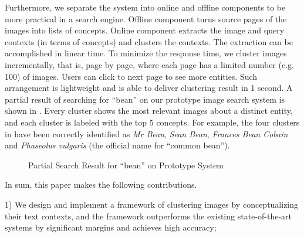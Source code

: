 Furthermore, we separate the system into online and offline
components to be more practical in a search engine.
Offline component turns source pages of the images into lists of
concepts. Online component extracts the image and query contexts (in terms of
concepts) and clusters the contexts.
The extraction can be accomplished in linear time.
To minimize the response time, we cluster images incrementally, that is,
page by page, where each page has a limited number
(e.g. 100) of images. Users can click to next page to see more entities.
Such arrangement is lightweight and is
able to deliver clustering result in 1 second.
A partial result of searching for ``bean'' on our prototype image search system
is shown in .
Every cluster shows the
most relevant images about a distinct entity, and each cluster is labeled with
the top 5 concepts. For example,
the four clusters in  have been correctly identified
as {\em Mr Bean}, {\em Sean Bean}, {\em Frances Bean Cobain} and
{\em Phaseolus vulgaris}
(the official name for ``common bean'').

\begin{figure}[th]
\centerline{}
\caption{Partial Search Result for ``bean'' on Prototype System}
\label{fig:demo-bean}
\end{figure}

In sum, this paper makes the following contributions.

1) We design and implement a framework of clustering images by
conceptualizing their text contexts, and the framework
outperforms the existing state-of-the-art systems by significant margins
and achieves high accuracy;

